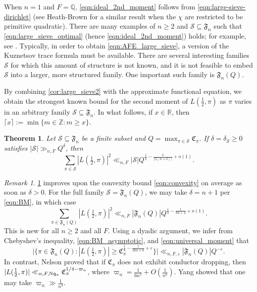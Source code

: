 \documentclass[11pt]{amsart}
\newtheorem{theorem}{Theorem}[section]
\theoremstyle{remark}
\newtheorem*{remark}{Remark}
\numberwithin{equation}{section}
\newcommand{\kq}{\mathfrak{q}}
\newcommand{\N}{\textnormal{N}}
\newcommand{\Z}{\mathbb{Z}}
\newcommand{\R}{\mathbb{R}}
\newcommand{\Q}{\mathbb{Q}}
\renewcommand{\epsilon}{\varepsilon}
\begin{document}
When $n=1$ and $F=\Q$, \eqref{eqn:ideal_2nd_moment} follows from \eqref{eqn:large-sieve-dirichlet} (see Heath-Brown \cite{HB_real} for a similar result when the $\chi$ are restricted to be primitive quadratic).   There are many examples of $n\geq 2$ and $\mathcal{S}\subseteq\mathfrak{F}_n$ such that \eqref{eqn:large_sieve_optimal} (hence \eqref{eqn:ideal_2nd_moment}) holds; for example, see \cite{blomer2023density,deshouillers1982kloosterman,jana2020applications}.  Typically, in order to obtain \eqref{eqn:AFE_large_sieve}, a version of the Kuznetsov trace formula must be available. There are several interesting families $\mathcal{S}$ for which this amount of structure is not known, and it is not feasible to embed $\mathcal{S}$ into a larger, more structured family.  One important such family is $\mathfrak{F}_n(Q)$.

By combining \cref{cor:large_sieve2} with the approximate functional equation, we obtain the strongest known bound for the second moment of $L(\frac{1}{2},\pi)$ as $\pi$ varies in an arbitrary family $\mathcal{S}\subseteq\mathfrak{F}_n$.  In what follows, if $x\in\R$, then $\lceil x\rceil := \min\{m\in\Z\colon m\geq x\}$.

\begin{theorem}
\label{thm:2ndMoment}
Let $\mathcal{S}\subseteq\mathfrak{F}_n$ be a finite subset and $Q=\max_{\pi\in\mathcal{S}}\mathfrak{C}_{\pi}$.  If $\delta=\delta_{\mathcal{S}}\geq 0$ satisfies $|\mathcal{S}|\gg_{n,F} Q^{\delta}$, then
\[
\sum_{\pi\in\mathcal{S}}|L(\tfrac{1}{2},\pi)|^2\ll_{n,F} |\mathcal{S}|Q^{\frac{1}{2}-\frac{\delta}{\lceil 2(n+\delta)\rceil}+o(1)}.
\]
\end{theorem}

\begin{remark}
\cref{thm:2ndMoment} improves upon the convexity bound \cref{eqn:convexity} on average as soon as $\delta >0$.
For the full family $\mathcal{S}=\mathfrak{F}_n(Q)$, we may take $\delta = n+1$ per \eqref{eqn:BM}, in which case
\begin{equation}
\label{eqn:universal_moment}
\sum_{\pi\in\mathfrak{F}_n(Q)}|L(\tfrac{1}{2},\pi)|^2\ll_{n,F} |\mathfrak{F}_n(Q)| Q^{\frac{1}{4}-\frac{1}{8n+4}+o(1)}.
\end{equation}
This is new for all $n\geq 2$ and all $F$. Using a dyadic argument, we infer from Chebyshev's inequality, \eqref{eqn:BM_asymptotic}, and \eqref{eqn:universal_moment} that 
\begin{equation}
\label{eqn:Chebyshev_moment}
\Big|\Big\{\pi\in\mathfrak{F}_n(Q)\colon |L(\tfrac{1}{2},\pi)|\geq \mathfrak{C}_{\pi}^{\frac{1}{8}-\frac{1}{16n+8}+\epsilon}\Big\}\Big|\ll_{n,F,\epsilon} |\mathfrak{F}_n(Q)| Q^{-\epsilon}.
\end{equation}
In contrast, Nelson \cite[Theorem 1.2]{Nelson} proved that if $\mathfrak{C}_{\pi}$ does not exhibit conductor dropping, then $|L(\frac{1}{2},\pi)|\ll_{n,F,\N\kq_{\pi}}\mathfrak{C}_{\pi}^{1/4-\varpi_n}$, where $\varpi_n = \frac{1}{6n^5}+O(\frac{1}{n^6})$.  Yang \cite{Yang} showed that one may take $\varpi_n\gg\frac{1}{n^3}$.
\end{remark}
\end{document}
